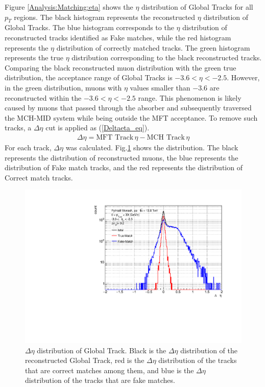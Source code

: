             Figure \ref{Analysis:Matching:eta} shows the \(\eta\) distribution of Global Tracks for all \(p_T\) regions. The black histogram represents the reconstructed \(\eta\) distribution of Global Tracks. The blue histogram corresponds to the \(\eta\) distribution of reconstructed tracks identified as Fake matches, while the red histogram represents the \(\eta\) distribution of correctly matched tracks. The green histogram represents the true \(\eta\) distribution corresponding to the black reconstructed tracks.  
            Comparing the black reconstructed muon distribution with the green true distribution, the acceptance range of Global Tracks is \(-3.6 < \eta < -2.5\). However, in the green distribution, muons with \(\eta\) values smaller than \(-3.6\) are reconstructed within the \(-3.6 < \eta < -2.5\) range. This phenomenon is likely caused by muons that passed through the absorber and subsequently traversed the MCH-MID system while being outside the MFT acceptance. 
            To remove such tracks, a \(\Delta \eta\) cut is applied as (\ref{Deltaeta_eq}).
            \begin{eqnarray}
                \label{Deltaeta_eq}
                \Delta \eta = \text{MFT Track} \, \eta - \text{MCH Track} \, \eta  
            \end{eqnarray}
            For each track, \(\Delta \eta\) was calculated. Fig.\ref{Analysis:Matching:DeltaEta} shows the distribution. The black represents the distribution of reconstructed muons, the blue represents the distribution of Fake match tracks, and the red represents the distribution of Correct match tracks.
            \begin{figure}[H]
                \centering
                \includegraphics[keepaspectratio, scale=0.5]{fig/3_5_6_etacutno_deltaeta.pdf} %
                \caption{$\Delta \eta$ distribution of Global Track. Black is the $\Delta \eta$ distribution of the reconstructed Global Track, red is the $\Delta \eta$ distribution of the tracks that are correct matches among them, and blue is the $\Delta \eta$ distribution of the tracks that are fake matches.}
                \label{Analysis:Matching:DeltaEta}
            \end{figure}
